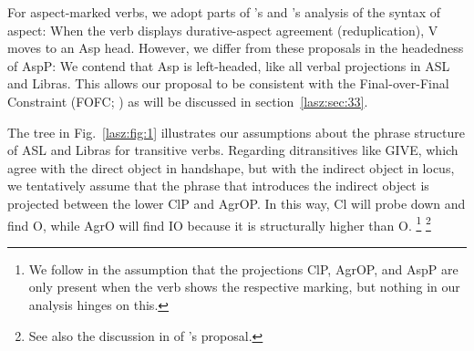 \documentclass[output=paper,colorlinks,citecolor=brown,
]{langscibook}
\newcommand{\citeapos}[1]{\citeauthor{#1}'s \citeyearpar{#1}}
\begin{document}
For aspect-marked verbs, we adopt parts of \citeapos{Matsuoka.1997}
and \citeapos{Braze.2004} analysis of the syntax of aspect: When the verb
displays durative-aspect agreement (reduplication), V moves to an Asp
head. However, we differ from these proposals in the headedness of
AspP: We contend that Asp is left-headed, like all verbal projections in
ASL and Libras. This allows our proposal to be consistent with the
Final-over-Final Constraint (FOFC; \citealp{BiberauerHR.2014,SheehanBRH.2017}) 
as will be discussed in section~\ref{lasz:sec:33}.

The tree in Fig.~\ref{lasz:fig:1} illustrates our assumptions about the phrase
structure of ASL and Libras for transitive verbs. Regarding
ditransitives like GIVE, which agree with the direct object in
handshape, but with the indirect object in locus, we tentatively assume
that the phrase that introduces the indirect object is projected between
the lower ClP and AgrOP. In this way, Cl will probe down and find O,
while AgrO will find IO because it is structurally higher than O.%
\footnote{
    We follow \citet{Quadros.etal.2004} in the assumption that the projections
    ClP, AgrOP, and AspP are only present when the verb shows the respective marking,
    but nothing in our analysis hinges on this.
}%
\footnote{
    See also the discussion in \citet{Pfau.etal.2018} of \citeapos{Nevins.2011} proposal.
}
\end{document}
